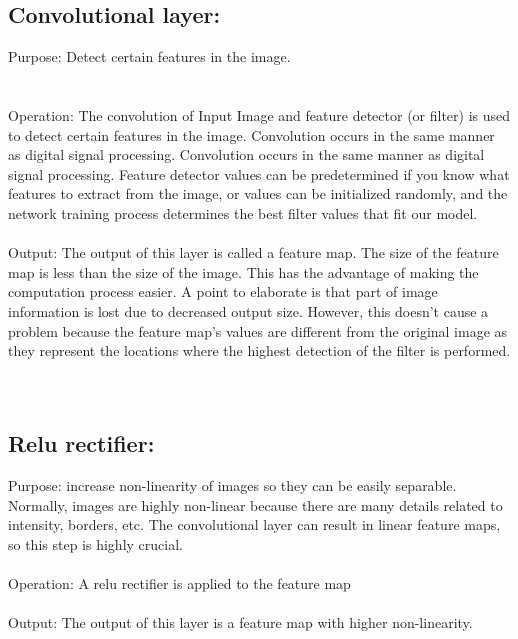 \documentclass[12pt,letterpaper, onecolumn]{exam}
\begin{document}
    \subsection{Convolutional layer:}
    Purpose: Detect certain features in the image.\\\\\\

  Operation: The convolution of Input Image and feature detector (or filter) is used to detect certain features in the image. Convolution occurs in the same manner as digital      signal processing. Convolution occurs in the same manner as digital signal processing. Feature detector values can be predetermined if you know what features to extract from   the image, or values can be initialized randomly, and the network training process determines the best filter values that fit our model.
\\\\
  Output: The output of this layer is called a feature map. The size of the feature map is less than the size of the image. This has the advantage of making the computation        process easier. A point to elaborate is that part of image information is lost due to decreased output size. However, this doesn’t cause a problem because the feature map’s      values are different from the original image as they represent the locations where the highest detection of the filter is performed.\\\\\\
    
    \subsection{Relu rectifier:}
    Purpose: increase non-linearity of images so they can be easily separable. Normally, images are highly non-linear because there are many details related to intensity, borders,   etc. The convolutional layer can result in linear feature maps, so this step is highly crucial.\\\\

  Operation: A relu rectifier is applied to the feature map
\\\\
  Output: The output of this layer is a feature map with higher non-linearity.\\\\\\
\end{document}
